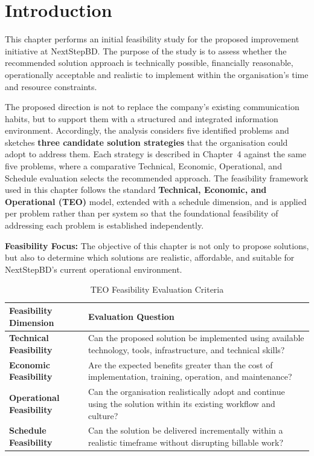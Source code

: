 \documentclass[12pt,a4paper]{report}
\begin{document}
\section{Introduction}
This chapter performs an initial feasibility study for the proposed improvement initiative at NextStepBD. The purpose of the study is to assess whether the recommended solution approach is technically possible, financially reasonable, operationally acceptable and realistic to implement within the organisation's time and resource constraints.

The proposed direction is not to replace the company's existing communication habits, but to support them with a structured and integrated information environment. Accordingly, the analysis considers five identified problems and sketches \textbf{three candidate solution strategies} that the organisation could adopt to address them. Each strategy is described in Chapter~4 against the same five problems, where a comparative Technical, Economic, Operational, and Schedule evaluation selects the recommended approach. The feasibility framework used in this chapter follows the standard \textbf{Technical, Economic, and Operational (TEO)} model, extended with a schedule dimension, and is applied per problem rather than per system so that the foundational feasibility of addressing each problem is established independently.

\begin{noteBox}
\textbf{Feasibility Focus:} The objective of this chapter is not only to propose solutions, but also to determine which solutions are realistic, affordable, and suitable for NextStepBD's current operational environment.
\end{noteBox}

\begin{table}[H]
\centering
\renewcommand{\arraystretch}{1.3}
\begin{tabularx}{\textwidth}{|p{4cm}|X|}
\hline
\rowcolor{secondary}
\textbf{Feasibility Dimension} & \textbf{Evaluation Question} \\
\hline
\textbf{Technical Feasibility} & Can the proposed solution be implemented using available technology, tools, infrastructure, and technical skills? \\
\hline
\textbf{Economic Feasibility} & Are the expected benefits greater than the cost of implementation, training, operation, and maintenance? \\
\hline
\textbf{Operational Feasibility} & Can the organisation realistically adopt and continue using the solution within its existing workflow and culture? \\
\hline
\textbf{Schedule Feasibility} & Can the solution be delivered incrementally within a realistic timeframe without disrupting billable work? \\
\hline
\end{tabularx}
\caption{TEO Feasibility Evaluation Criteria}
\end{table}
\end{document}
